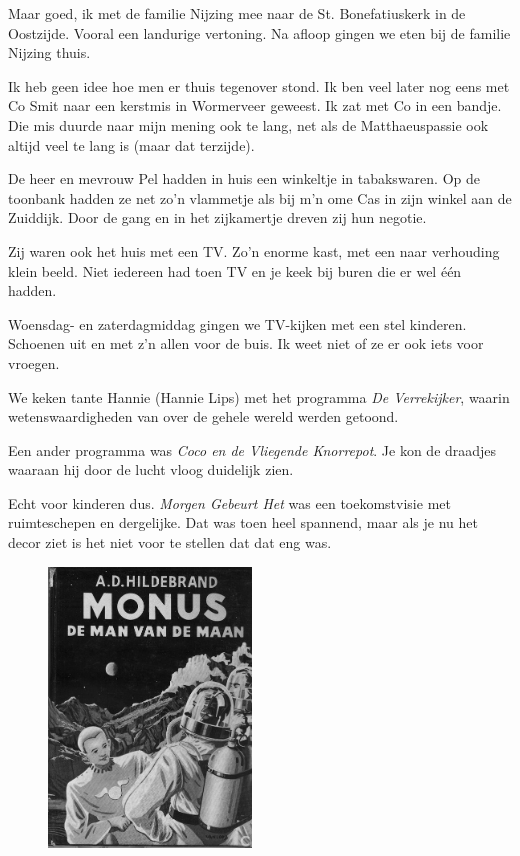\documentclass[12pt,twoside, openright]{memoir}
\begin{document}
Maar goed, ik met de familie Nijzing mee naar de St. Bonefatiuskerk in de Oostzijde. Vooral een landurige vertoning. Na afloop gingen we eten bij de familie Nijzing thuis. 

Ik heb geen idee hoe men er thuis tegenover stond. Ik ben veel later nog eens met Co Smit naar een kerstmis in Wormerveer geweest. Ik zat met Co in een bandje. Die mis duurde naar mijn mening ook te lang, net als de Matthaeuspassie ook altijd veel te lang is (maar dat terzijde).

De heer en mevrouw Pel hadden in huis een winkeltje in tabakswaren. Op de toonbank hadden ze net zo'n vlammetje als bij m'n ome Cas in zijn winkel aan de Zuiddijk. Door de gang en in het zijkamertje dreven zij hun negotie. 

Zij waren ook het huis met een TV. Zo’n enorme kast, met een naar verhouding klein beeld. Niet iedereen had toen TV en je keek bij buren die er wel één hadden.

Woensdag- en zaterdagmiddag gingen we TV-kijken met een stel kinderen. Schoenen uit en met z'n allen voor de buis. Ik weet niet of ze er ook iets voor vroegen.

We keken tante Hannie (Hannie Lips) met het programma \emph{De Verrekijker}, waarin wetenswaardigheden van over de gehele wereld werden getoond. 

Een ander programma was \emph{Coco en de Vliegende Knorrepot}. Je kon de draadjes waaraan hij door de lucht vloog duidelijk zien. 

Echt voor kinderen dus. \emph{Morgen Gebeurt Het} was een toekomstvisie met ruimteschepen en dergelijke. Dat was toen heel spannend, maar als je nu het decor ziet is het niet voor te stellen dat dat eng was.

\begin{figure}
\begin{center}
\includegraphics[width=0.48\textwidth]{img/Monus}
\end{center}
\end{figure}
\end{document}
